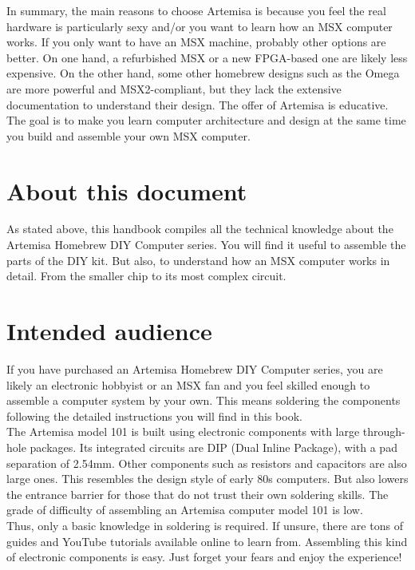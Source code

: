 In summary, the main reasons to choose Artemisa is because you feel the real hardware is particularly sexy and/or you want to learn how an MSX computer works. If you only want to have an MSX machine, probably other options are better. On one hand, a refurbished MSX or a new FPGA-based one are likely less expensive. On the other hand, some other homebrew designs such as the Omega are more powerful and MSX2-compliant, but they lack the extensive documentation to understand their design. The offer of Artemisa is educative. The goal is to make you learn computer architecture and design at the same time you build and assemble your own MSX computer. \\

\section{About this document}

As stated above, this handbook compiles all the technical knowledge about the Artemisa Homebrew DIY Computer series. You will find it useful to assemble the parts of the DIY kit. But also, to understand how an MSX computer works in detail. From the smaller chip to its most complex circuit. 

\section{Intended audience}

If you have purchased an Artemisa Homebrew DIY Computer series, you are likely an electronic hobbyist or an MSX fan and you feel skilled enough to assemble a computer system by your own. This means soldering the components following the detailed instructions you will find in this book. \\

The Artemisa model 101 is built using electronic components with large through-hole packages. Its integrated circuits are DIP (Dual Inline Package), with a pad separation of 2.54mm. Other components such as resistors and capacitors are also large ones. This resembles the design style of early 80s computers. But also lowers the entrance barrier for those that do not trust their own soldering skills. The grade of difficulty of assembling an Artemisa computer model 101 is low. \\

Thus, only a basic knowledge in soldering is required. If unsure, there are tons of guides and YouTube tutorials available online to learn from. Assembling this kind of electronic components is easy. Just forget your fears and enjoy the experience!\\

